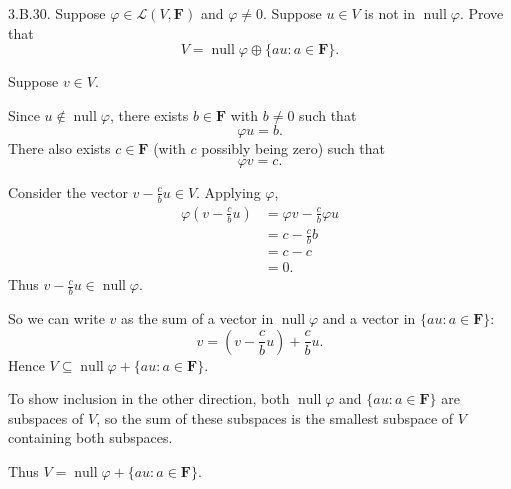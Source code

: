 \documentclass[a5paper]{article}
\begin{document}
\newcommand   \C           {\mathbf{C}}
\newcommand   \R           {\mathbf{R}}
\renewcommand \L           {\mathcal{L}}
\newcommand   \F           {\mathbf{F}}
\renewcommand \P           {\mathcal{P}}
\newcommand   \M           {\mathcal{M}}
\newcommand   \op          {\operatorname}

    3.B.30.
    Suppose $\varphi \in \L(V,\F)$ and $\varphi \neq 0$.
    Suppose $u \in V$ is not in $\op{null}\varphi$.
    Prove that
\begin{equation*}
        V = \op{null}\varphi \oplus \{au : a \in \F\} .
\end{equation*}

    Suppose $v \in V$.

    Since $u \notin \op{null}\varphi$, there exists $b \in \F$ with $b \neq 0$ such that
\begin{equation*}
        \varphi u = b .
\end{equation*}
    There also exists $c \in \F$ (with $c$ possibly being zero) such that
\begin{equation*}
        \varphi v = c .
\end{equation*}

    Consider the vector $v - \frac{c}{b} u \in V$.
    Applying $\varphi$,
\begin{align*}
        \varphi \left( v - \frac{c}{b} u \right) &= \varphi v - \frac{c}{b} \varphi u \\
                                                &= c - \frac{c}{b} b \\
                                                &= c - c \\
                                                &= 0 .
\end{align*}
    Thus $v - \frac{c}{b} u \in \op{null}\varphi$.

    So we can write $v$ as the sum of a vector in $\op{null}\varphi$ and a vector in $\{au: a \in \F\}$:
\begin{equation*}
        v = \left( v - \frac{c}{b} u \right) + \frac{c}{b} u .
\end{equation*}
    Hence $V \subseteq \op{null}\varphi + \{au : a \in \F\}$.

    To show inclusion in the other direction, both $\op{null}\varphi$ and $\{au : a \in \F\}$ are subspaces of $V$, so the sum of these subspaces is the smallest subspace of $V$ containing both subspaces.

    Thus $V = \op{null}\varphi + \{au : a \in \F\}$.
\end{document}
